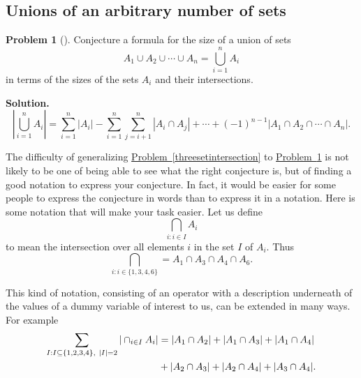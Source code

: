 \documentclass[10pt,]{book}
\theoremstyle{plain}
\theoremstyle{definition}
\newtheorem{activity}[project]{Problem}
\theoremstyle{definition}
\numberwithin{equation}{chapter}
\newcommand{\amp}{&}
\begin{document}
\subsection[{Unions of an arbitrary number of sets}]{Unions of an arbitrary number of sets}\label{subsection-44}
\begin{activity}[]\label{nsetintersection}
Conjecture a formula for the size of a union of sets%
\begin{equation*}
A_1\cup
A_2\cup \cdots\cup A_n = \bigcup_{i=1}^n A_i
\end{equation*}
in terms of the sizes of the sets \(A_i\) and their intersections.%
\par\medskip\noindent%
\textbf{Solution.}\quad %
\begin{equation*}
\left|\bigcup_{i=1}^n A_i\right| = \sum_{i=1}^n|A_i| -
\sum_{i=1}^n\sum_{j=i+1}^n |A_i \cap A_j| + \cdots +(-1)^{n-1} |A_1\cap
A_2\cap\cdots \cap A_n|.
\end{equation*}
%
\end{activity}
The difficulty of generalizing \hyperref[threesetintersection]{Problem~\ref{threesetintersection}} to \hyperref[nsetintersection]{Problem~\ref{nsetintersection}} is not likely to be one of being able to see what the right conjecture is, but of finding a good notation to express your conjecture. In fact, it would be easier for some people to express the conjecture in words than to express it in a notation. Here is some notation that will make your task easier. Let us define%
\begin{equation*}
\bigcap_{i:i\in I}A_i
\end{equation*}
to mean the intersection over all elements \(i\) in the set \(I\) of \(A_i\). Thus%
\begin{equation}
\bigcap_{i:i\in
\{1,3,4,6\}} = A_1\cap A_3\cap A_4 \cap A_6.\label{intersectionnotation}
\end{equation}
%
\par
This kind of notation, consisting of an operator with a description underneath of the values of a dummy variable of interest to us, can be extended in many ways. For example%
\begin{align}
\sum_{I:I \subseteq \{1,2,3,4\}, \ |I|=2} |\cap_{i\in I}
A_i|  \amp =  |A_1\cap A_2|+ |A_1\cap A_3|
+|A_1\cap A_4|\notag\\
\amp +  |A_2\cap A_3|+
|A_2\cap A_4| +|A_3\cap A_4|.\label{notationsolution}
\end{align}
%
\end{document}
